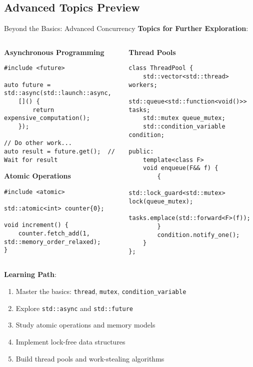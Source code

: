 \subsection{Advanced Topics Preview}
\begin{frame}[fragile]{ Beyond the Basics: Advanced Concurrency}
	\textbf{Topics for Further Exploration}:

	\begin{columns}
		\begin{column}{0.5\textwidth}
			\textbf{Asynchronous Programming}
			\begin{verbatim}
#include <future>

auto future = std::async(std::launch::async,
    []() {
        return expensive_computation();
    });

// Do other work...
auto result = future.get();  // Wait for result
			\end{verbatim}

			\textbf{Atomic Operations}
			\begin{verbatim}
#include <atomic>

std::atomic<int> counter{0};

void increment() {
    counter.fetch_add(1, std::memory_order_relaxed);
}
			\end{verbatim}
		\end{column}
		\begin{column}{0.5\textwidth}
			\textbf{Thread Pools}
			\begin{verbatim}
class ThreadPool {
    std::vector<std::thread> workers;
    std::queue<std::function<void()>> tasks;
    std::mutex queue_mutex;
    std::condition_variable condition;

public:
    template<class F>
    void enqueue(F&& f) {
        {
            std::lock_guard<std::mutex> lock(queue_mutex);
            tasks.emplace(std::forward<F>(f));
        }
        condition.notify_one();
    }
};
			\end{verbatim}
		\end{column}
	\end{columns}

	\vspace{1em}
	\textbf{Learning Path}:
	\begin{enumerate}
		\item Master the basics: \texttt{thread}, \texttt{mutex}, \texttt{condition\_variable}
		\item Explore \texttt{std::async} and \texttt{std::future}
		\item Study atomic operations and memory models
		\item Implement lock-free data structures
		\item Build thread pools and work-stealing algorithms
	\end{enumerate}
\end{frame}

